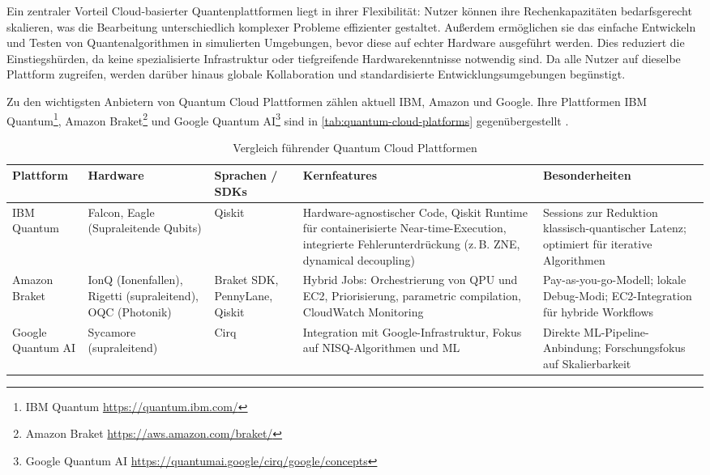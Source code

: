 Ein zentraler Vorteil Cloud-basierter Quantenplattformen liegt in ihrer Flexibilität: Nutzer können ihre Rechenkapazitäten bedarfsgerecht skalieren, was die Bearbeitung unterschiedlich komplexer Probleme effizienter gestaltet. Außerdem ermöglichen sie das einfache Entwickeln und Testen von Quantenalgorithmen in simulierten Umgebungen, bevor diese auf echter Hardware ausgeführt werden. Dies reduziert die Einstiegshürden, da keine spezialisierte Infrastruktur oder tiefgreifende Hardwarekenntnisse notwendig sind. Da alle Nutzer auf dieselbe Plattform zugreifen, werden darüber hinaus globale Kollaboration und standardisierte Entwicklungsumgebungen begünstigt.

Zu den wichtigsten Anbietern von Quantum Cloud Plattformen zählen aktuell IBM, Amazon und Google. Ihre Plattformen IBM Quantum\footnote{IBM Quantum \url{https://quantum.ibm.com/}}, Amazon Braket\footnote{Amazon Braket \url{https://aws.amazon.com/braket/}} und Google Quantum AI\footnote{Google Quantum AI \url{https://quantumai.google/cirq/google/concepts}} sind in \autoref{tab:quantum-cloud-platforms} gegenübergestellt \autocite{trends+challenges-TODO-sync}.

\begin{table}[ht!]
\centering
\begin{tabular}{|p{2.8cm}|p{2.5cm}|p{2.5cm}|p{4.5cm}|p{3.5cm}|}
\hline
\textbf{Plattform} & \textbf{Hardware} & \textbf{Sprachen / SDKs} & \textbf{Kernfeatures} & \textbf{Besonderheiten} \\
\hline
IBM Quantum & Falcon, Eagle (Supraleitende Qubits) & Qiskit & Hardware-agnostischer Code, Qiskit Runtime für containerisierte Near-time-Execution, integrierte Fehlerunterdrückung (z.\,B. ZNE, dynamical decoupling) & Sessions zur Reduktion klassisch-quantischer Latenz; optimiert für iterative Algorithmen \\
\hline
Amazon Braket & IonQ (Ionenfallen), Rigetti (supraleitend), OQC (Photonik) & Braket SDK, PennyLane, Qiskit & Hybrid Jobs: Orchestrierung von QPU und EC2, Priorisierung, parametric compilation, CloudWatch Monitoring & Pay-as-you-go-Modell; lokale Debug-Modi; EC2-Integration für hybride Workflows \\
\hline
Google Quantum AI & Sycamore (supraleitend) & Cirq & Integration mit Google-Infrastruktur, Fokus auf NISQ-Algorithmen und ML & Direkte ML-Pipeline-Anbindung; Forschungsfokus auf Skalierbarkeit \\
\hline
\end{tabular}
\caption{Vergleich führender Quantum Cloud Plattformen}
\label{tab:quantum-cloud-platforms}
\end{table}

